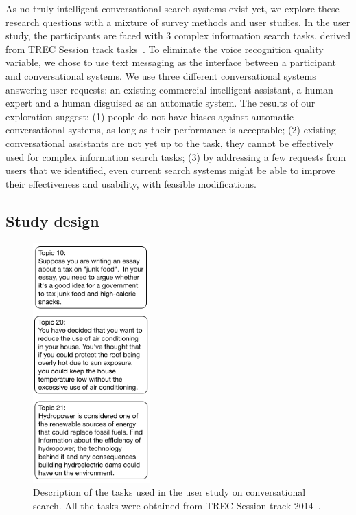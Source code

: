 As no truly intelligent conversational search systems exist yet, we explore these research questions with a mixture of survey methods and user studies.
In the user study, the participants are faced with 3 complex information search tasks, derived from TREC Session track tasks~\cite{sessionTrack2014Overview}.
To eliminate the voice recognition quality variable, we chose to use text messaging as the interface between a participant and conversational systems.
We use three different conversational systems answering user requests: an existing commercial intelligent assistant, a human expert and a human disguised as an automatic system.
The results of our exploration suggest:
(1) people do not have biases against automatic conversational systems, as long as their performance is acceptable;
(2) existing conversational assistants are not yet up to the task, \ie they cannot be effectively used for complex information search tasks;
(3) by addressing a few requests from users that we identified, even current search systems might be able to improve their effectiveness and usability, with feasible modifications. 

\subsection{Study design}
\label{section:conversation:user-study:design}

\begin{figure}[h!]
	\centering
	\includegraphics[width=0.4\textwidth]{img/FramedTopicsLeftAlign}
	\caption{Description of the tasks used in the user study on conversational search. All the tasks were obtained from TREC Session track 2014~\cite{sessionTrack2014Overview}.}
	\label{figure:conversation:user-study:tasks}
\end{figure}

